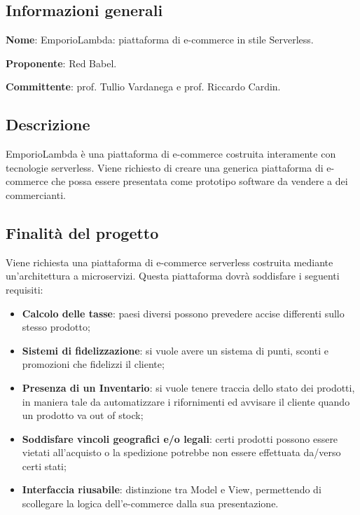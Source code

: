 \documentclass[../studio-di-fattibilita.tex]{subfiles}
\begin{document}
\subsection{Informazioni generali}%
\label{sub:c2_informazioni_generale}
\begin{description}
  \item \textbf{Nome}: EmporioLambda: piattaforma di e-commerce in stile Serverless.
  \item \textbf{Proponente}: Red Babel.
  \item \textbf{Committente}: prof. Tullio Vardanega e prof. Riccardo Cardin.
\end{description}

\subsection{Descrizione}%
\label{sub:c2_descrizione}
EmporioLambda è una piattaforma di e-commerce costruita interamente con tecnologie serverless.
Viene richiesto di creare una generica piattaforma di e-commerce che possa essere presentata come prototipo software da vendere a dei commercianti.


\subsection{Finalità del progetto}%
\label{sub:c2_finalita_del_progetto}
Viene richiesta una piattaforma di e-commerce serverless costruita mediante un’architettura a microservizi. Questa piattaforma dovrà soddisfare i seguenti requisiti:
\begin{itemize}
  \item \textbf{Calcolo delle tasse}: paesi diversi possono prevedere accise differenti sullo stesso prodotto;
  \item \textbf{Sistemi di fidelizzazione}: si vuole avere un sistema di punti, sconti e promozioni che fidelizzi il cliente;
  \item \textbf{Presenza di un Inventario}: si vuole tenere traccia dello stato dei prodotti, in maniera tale da automatizzare i rifornimenti ed avvisare il cliente quando un prodotto va out of stock;
  \item \textbf{Soddisfare vincoli geografici e/o legali}: certi prodotti possono essere vietati all’acquisto o la spedizione potrebbe non essere effettuata da/verso certi stati;
  \item \textbf{Interfaccia riusabile}: distinzione tra Model e View, permettendo di scollegare la logica dell’e-commerce dalla sua presentazione.
\end{itemize}
\end{document}
